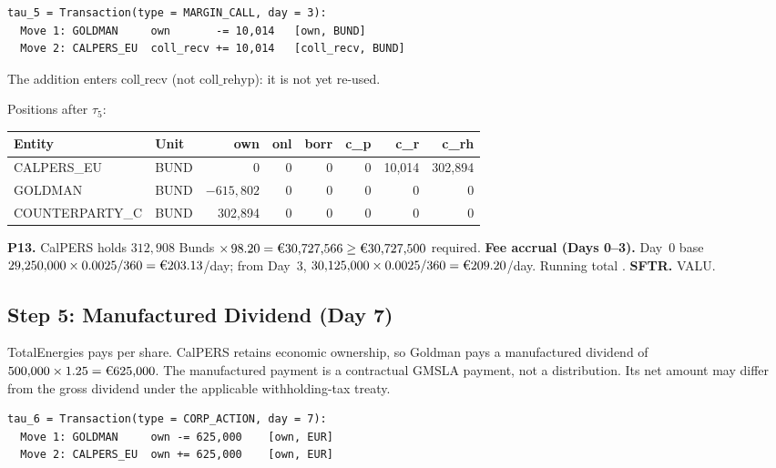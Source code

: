 \begin{lstlisting}
tau_5 = Transaction(type = MARGIN_CALL, day = 3):
  Move 1: GOLDMAN     own       -= 10,014   [own, BUND]
  Move 2: CALPERS_EU  coll_recv += 10,014   [coll_recv, BUND]
\end{lstlisting}

\noindent The addition enters $\mathrm{coll\_recv}$ (not $\mathrm{coll\_rehyp}$): it is not yet re-used.

Positions after $\tau_5$:

\begin{center}\small
\begin{tabular}{l l r r r r r r}
\toprule
\textbf{Entity} & \textbf{Unit} & own & onl & borr & c\_p & c\_r & c\_rh \\
\midrule
CALPERS\_EU & BUND & 0 & 0 & 0 & 0 & 10{,}014 & 302{,}894 \\
GOLDMAN & BUND & $-615{,}802$ & 0 & 0 & 0 & 0 & 0 \\
COUNTERPARTY\_C & BUND & 302{,}894 & 0 & 0 & 0 & 0 & 0 \\
\bottomrule
\end{tabular}
\end{center}

\noindent\textbf{P13.} CalPERS holds $312{,}908$ Bunds $\times\,98.20 = \text{\EUR{30,727,566}} \geq \text{\EUR{30,727,500}}$ required. \checkmark\quad
\textbf{Fee accrual (Days 0--3).} Day~0 base $29{,}250{,}000 \times 0.0025/360 = \text{\EUR{203.13}}$/day; from Day~3, $30{,}125{,}000 \times 0.0025/360 = \text{\EUR{209.20}}$/day. Running total .\quad
\textbf{SFTR.} VALU.

\subsection{Step 5: Manufactured Dividend (Day 7)}
\label{sec:eu-step5}

TotalEnergies pays  per share. CalPERS retains economic ownership, so Goldman pays a manufactured dividend of $500{,}000 \times 1.25 = \text{\EUR{625,000}}$. The manufactured payment is a contractual GMSLA payment, not a distribution. Its net amount may differ from the gross dividend under the applicable withholding-tax treaty.

\begin{lstlisting}
tau_6 = Transaction(type = CORP_ACTION, day = 7):
  Move 1: GOLDMAN     own -= 625,000    [own, EUR]
  Move 2: CALPERS_EU  own += 625,000    [own, EUR]
\end{lstlisting}

